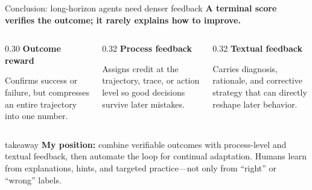 \begin{frame}[t]{Conclusion: long-horizon agents need denser feedback}
  \vspace{1mm}
  {\Large\textbf{A terminal score verifies the outcome; it rarely explains how to improve.}}

  \vspace{5mm}
  \begin{columns}[T,onlytextwidth]
    \begin{column}{0.30\textwidth}
      {\large\color{DeckRed}\textbf{Outcome reward}}
      \vspace{2mm}

      Confirms success or failure, but compresses an entire trajectory into one number.
    \end{column}
    \begin{column}{0.32\textwidth}
      {\large\color{DeckGold}\textbf{Process feedback}}
      \vspace{2mm}

      Assigns credit at the trajectory, trace, or action level so good decisions survive later mistakes.
    \end{column}
    \begin{column}{0.32\textwidth}
      {\large\color{DeckTeal}\textbf{Textual feedback}}
      \vspace{2mm}

      Carries diagnosis, rationale, and corrective strategy that can directly reshape later behavior.
    \end{column}
  \end{columns}

  \vspace{6mm}
  \begin{beamercolorbox}[wd=\textwidth,sep=2mm]{takeaway}
    \small \textbf{My position:} combine verifiable outcomes with process-level and textual feedback, then automate the loop for continual adaptation. Humans learn from explanations, hints, and targeted practice---not only from ``right'' or ``wrong'' labels.
  \end{beamercolorbox}
\end{frame}
